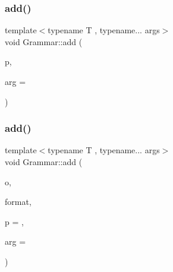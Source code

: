 \mbox{\label{class_grammar_af96467de4413d3e5a0d2f291992365d9}} 
\subsubsection{\texorpdfstring{add()}{add()}\hspace{0.1cm}{\footnotesize\ttfamily [4/6]}}
{\footnotesize\ttfamily template$<$typename T , typename... args$>$ \\
void Grammar\+::add (\begin{DoxyParamCaption}\item[{\hyperlink{struct_builtin_primitive}{Builtin\+Primitive}$<$ T, args... $>$}]{p,  }\item[{const int}]{arg = {} }\end{DoxyParamCaption})\hspace{0.3cm}{\ttfamily [inline]}}

\mbox{\label{class_grammar_a562f3b4113e3f2764832ac828ffb58fc}} 
\subsubsection{\texorpdfstring{add()}{add()}\hspace{0.1cm}{\footnotesize\ttfamily [5/6]}}
{\footnotesize\ttfamily template$<$typename T , typename... args$>$ \\
void Grammar\+::add (\begin{DoxyParamCaption}\item[{\hyperlink{_instruction_8h_af2fb7c87c5854c5733d7bb0506b06de7}{Builtin\+Op}}]{o,  }\item[{std\+::string}]{format,  }\item[{const double}]{p = {},  }\item[{const int}]{arg = {} }\end{DoxyParamCaption})\hspace{0.3cm}{\ttfamily [inline]}}

\mbox{\label{class_grammar_aba61b4a7563c249a27ad7b6b808ee575}} 
